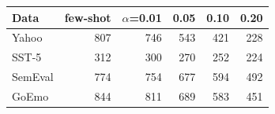 \begin{tabular}{lrrrrr}
\toprule
Data & few-shot & $\alpha$=0.01 & 0.05 & 0.10 & 0.20 \\
\midrule
Yahoo & 807 & 746 & 543 & 421 & 228 \\
SST-5 & 312 & 300 & 270 & 252 & 224 \\
SemEval & 774 & 754 & 677 & 594 & 492 \\
GoEmo & 844 & 811 & 689 & 583 & 451 \\
\bottomrule
\end{tabular}
